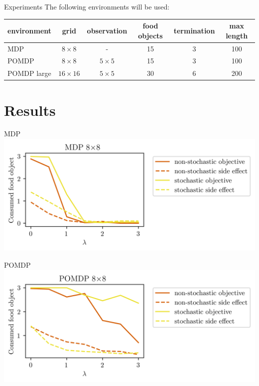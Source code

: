 \documentclass[10pt]{beamer}
\begin{document}
\begin{frame}{Experiments}
  The following environments will be used:
  \begin{table}
\footnotesize
\centering
    \begin{tabular}{l | c | c | c | c | c}
      environment & grid & observation & food objects & termination & max length\\ \hline
      MDP & $8 \times 8$ & - & 15 & 3 & 100\\
      POMDP & $8 \times 8$ & $5 \times 5$ & 15 & 3 & 100\\
      POMDP large & $16 \times 16$ & $5 \times 5$ & 30 & 6 & 200\\
    \end{tabular}
  \end{table}
  \begin{itemize}
  \end{itemize}
\end{frame}


\section{Results}

\begin{frame}{MDP}
  \centering
  \includegraphics[scale=0.8]{"./figures/static_8x8_result_plot.png"}
\end{frame}

\begin{frame}{POMDP}
  \centering
  \includegraphics[scale=0.8]{"./figures/pomdp_8x8_result_plot.png"}
\end{frame}
\end{document}
